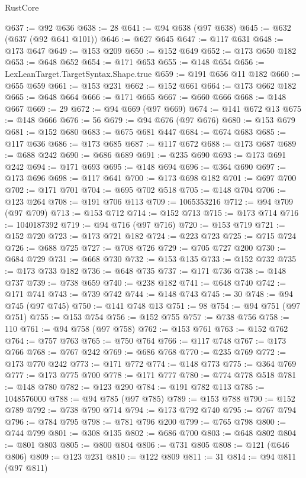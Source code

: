 \begin{lexlean}{RustCore}
\begin{coremodule}
@637 := @92 @636
@638 := 28
@641 := @94 @638 (@97 @638)
@645 := @632 (@637 (@92 @641 @101))
@646 := @627 @645
@647 := @117 @631
@648 := @173 @647
@649 := @153 @209
@650 := @152 @649
@652 := @173 @650 @182
@653 := @648 @652
@654 := @171 @653
@655 := @148 @654
@656 := LexLeanTarget.TargetSyntax.Shape.true
@659 := @191 @656 @11 @182
@660 := @655 @659
@661 := @153 @231
@662 := @152 @661
@664 := @173 @662 @182
@665 := @648 @664
@666 := @171 @665
@667 := @660 @666
@668 := @148 @667
@669 := 29
@672 := @94 @669 (@97 @669)
@674 := @141 @672 @13
@675 := @148 @666
@676 := 56
@679 := @94 @676 (@97 @676)
@680 := @153 @679
@681 := @152 @680
@683 := @675 @681 @447
@684 := @674 @683
@685 := @117 @636
@686 := @173 @685
@687 := @117 @672
@688 := @173 @687
@689 := @688 @242
@690 := @686 @689
@691 := @235 @690
@693 := @173 @691 @242
@694 := @171 @693
@695 := @148 @694
@696 := @364 @690
@697 := @173 @696
@698 := @117 @641
@700 := @173 @698 @182
@701 := @697 @700
@702 := @171 @701
@704 := @695 @702 @518
@705 := @148 @704
@706 := @123 @264
@708 := @191 @706 @113
@709 := 1065353216
@712 := @94 @709 (@97 @709)
@713 := @153 @712
@714 := @152 @713
@715 := @173 @714
@716 := 1040187392
@719 := @94 @716 (@97 @716)
@720 := @153 @719
@721 := @152 @720
@723 := @173 @721 @182
@724 := @223 @723
@725 := @715 @724
@726 := @688 @725
@727 := @708 @726
@729 := @705 @727 @200
@730 := @684 @729
@731 := @668 @730
@732 := @153 @135
@733 := @152 @732
@735 := @173 @733 @182
@736 := @648 @735
@737 := @171 @736
@738 := @148 @737
@739 := @738 @659
@740 := @238 @182
@741 := @648 @740
@742 := @171 @741
@743 := @739 @742
@744 := @148 @743
@745 := 30
@748 := @94 @745 (@97 @745)
@750 := @141 @748 @13
@751 := 98
@754 := @94 @751 (@97 @751)
@755 := @153 @754
@756 := @152 @755
@757 := @738 @756
@758 := 110
@761 := @94 @758 (@97 @758)
@762 := @153 @761
@763 := @152 @762
@764 := @757 @763
@765 := @750 @764
@766 := @117 @748
@767 := @173 @766
@768 := @767 @242
@769 := @686 @768
@770 := @235 @769
@772 := @173 @770 @242
@773 := @171 @772
@774 := @148 @773
@775 := @364 @769
@777 := @173 @775 @700
@778 := @171 @777
@780 := @774 @778 @518
@781 := @148 @780
@782 := @123 @290
@784 := @191 @782 @113
@785 := 1048576000
@788 := @94 @785 (@97 @785)
@789 := @153 @788
@790 := @152 @789
@792 := @738 @790 @714
@794 := @173 @792 @740
@795 := @767 @794
@796 := @784 @795
@798 := @781 @796 @200
@799 := @765 @798
@800 := @744 @799
@801 := @308 @135
@802 := @686 @700
@803 := @648 @802
@804 := @801 @803
@805 := @800 @804
@806 := @731 @805
@808 := @121 (@646 @806)
@809 := @123 @231
@810 := @122 @809
@811 := 31
@814 := @94 @811 (@97 @811)

\end{coremodule}
\end{lexlean}
